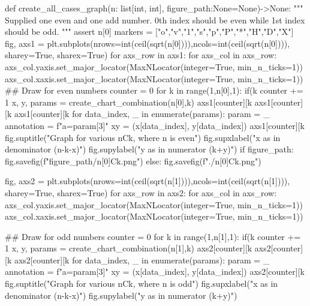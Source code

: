 \documentclass[PermutationsCombinationsWhyWholeNumber.tex]{subfiles}
\begin{document}
\begin{appendices}
\begin{python}
{def create_all_cases_graph(n: list[int, int], figure_path:None=None)->None:
    """
    Supplied one even and one add number. 0th index should be even while 1st index should be odd.
    """
    assert n[0]%
    markers = ["o","v","1","s","p","P","*","H","D","X"]
    fig, axs1 = plt.subplots(nrows=int(ceil(sqrt(n[0]))),ncols=int(ceil(sqrt(n[0]))), sharey=True, sharex=True)
    for axs_row in axs1:
        for axs_col in axs_row:
            axs_col.yaxis.set_major_locator(MaxNLocator(integer=True, min_n_ticks=1))
            axs_col.xaxis.set_major_locator(MaxNLocator(integer=True, min_n_ticks=1))
    ## Draw for even numbers
    counter = 0
    for k in range(1,n[0],1):
        if(k%
            counter += 1        
        x, y, params = create_chart_combination(n[0],k)
        axs1[counter][k%
        axs1[counter][k%
        axs1[counter][k%
        for data_index, _ in enumerate(params):
            param = _
            annotation = f"a={param[3]}"
            xy = (x[data_index], y[data_index])
            axs1[counter][k%
    fig.suptitle("Graph for various nCk, where n is even")
    fig.supxlabel("x as in denominator (n-k-x)")
    fig.supylabel("y as in numerator (k+y)")
    if figure_path:
        fig.savefig(f"{figure_path}/{n[0]}Ck.png")
    else:
        fig.savefig(f"./{n[0]}Ck.png")

    fig, axs2 = plt.subplots(nrows=int(ceil(sqrt(n[1]))),ncols=int(ceil(sqrt(n[1]))), sharey=True, sharex=True)
    for axs_row in axs2:
        for axs_col in axs_row:
            axs_col.yaxis.set_major_locator(MaxNLocator(integer=True, min_n_ticks=1))
            axs_col.xaxis.set_major_locator(MaxNLocator(integer=True, min_n_ticks=1))

    ## Draw for odd numbers
    counter = 0
    for k in range(1,n[1],1):
        if(k%
            counter += 1        
        x, y, params = create_chart_combination(n[1],k)
        axs2[counter][k%
        axs2[counter][k%
        axs2[counter][k%
        for data_index, _ in enumerate(params):
            param = _
            annotation = f"a={param[3]}"
            xy = (x[data_index], y[data_index]) 
            axs2[counter][k%
    fig.suptitle("Graph for various nCk, where n is odd")
    fig.supxlabel("x as in denominator (n-k-x)")
    fig.supylabel("y as in numerator (k+y)")

}
\end{python}
\end{appendices}
\end{document}
